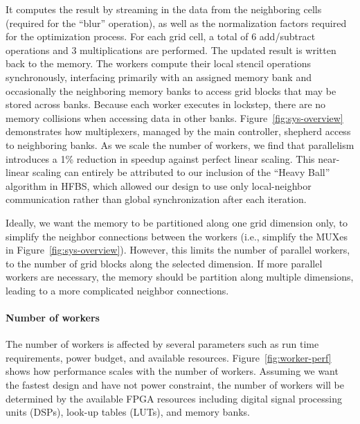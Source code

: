 It computes the result by streaming in the data from the neighboring cells (required for the ``blur'' operation), as well as the normalization factors required for the optimization process.
For each grid cell, a total of 6 add/subtract operations and 3 multiplications are performed. The updated result is written back to the memory.
The workers compute their local stencil operations synchronously, interfacing primarily with an assigned memory bank and occasionally the neighboring memory banks to access grid blocks that may be stored across banks.
Because each worker executes in lockstep, there are no memory collisions when accessing data in other banks.
Figure~\ref{fig:sys-overview} demonstrates how multiplexers, managed by the main controller, shepherd access to neighboring banks.
As we scale the number of workers, we find that parallelism introduces a 1\% reduction in speedup against perfect linear scaling.
This near-linear scaling can entirely be attributed to our inclusion of the ``Heavy Ball'' algorithm in HFBS, which allowed our design to use only local-neighbor communication rather than global synchronization after each iteration.


Ideally, we want the memory to be partitioned along one grid dimension only, to simplify the neighbor connections between the workers (i.e., simplify the MUXes in Figure~\ref{fig:sys-overview}).
However, this limits the number of parallel workers, to the number of grid blocks along the selected dimension.
If more parallel workers are necessary, the memory should be partition along multiple dimensions, leading to a more complicated neighbor connections.



\paragraph{Number of workers}
The number of workers is affected by several parameters such as run time requirements, power budget, and available resources. Figure~\ref{fig:worker-perf} shows how performance scales with the number of workers. Assuming we want the fastest design and have not power constraint, the number of workers will be determined by the available FPGA resources including digital signal processing units (DSPs), look-up tables (LUTs), and memory banks.

